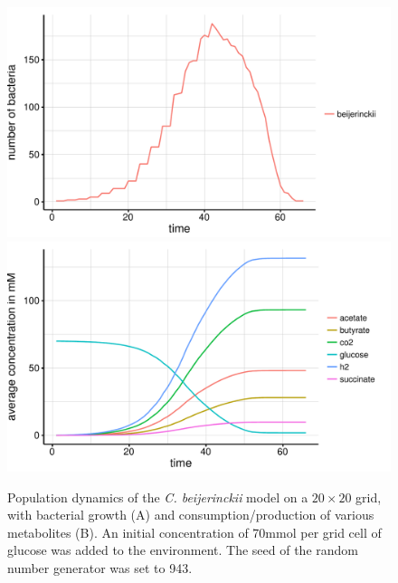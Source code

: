 \begin{figure}[h!]
  \centering
    \includegraphics[scale=0.45]{../results/img/beijerinckii_20x20_seed943_growth.pdf}
    \includegraphics[scale=0.45]{../results/img/beijerinckii_20x20_seed943_subs.pdf}
  \caption{Population dynamics of the \emph{C. beijerinckii} model on a $20\times20$ grid, with bacterial growth (A) and consumption/production of various metabolites (B). An initial concentration of 70\;mmol per grid cell of glucose was added to the environment. The seed of the random number generator was set to 943.}
  \label{fig:beijersg}
\end{figure}
